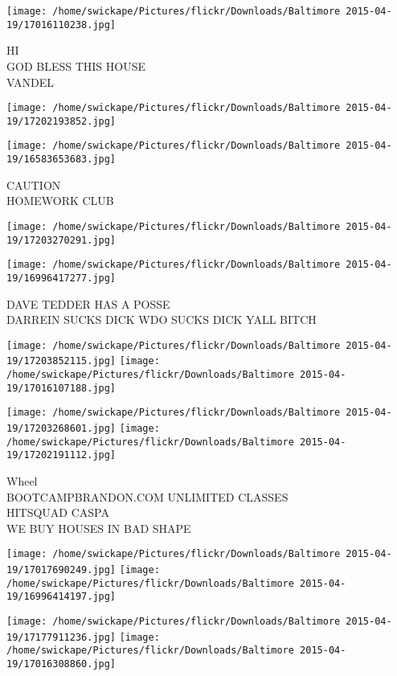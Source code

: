 \documentclass[10pt,letterpaper]{article}
\begin{document}
\texttt{[image: /home/swickape/Pictures/flickr/Downloads/Baltimore 2015-04-19/17016110238.jpg]}

HI\\
GOD BLESS THIS HOUSE\\
VANDEL\\
\pagebreak

\texttt{[image: /home/swickape/Pictures/flickr/Downloads/Baltimore 2015-04-19/17202193852.jpg]}

\vspace{0.25in}
\texttt{[image: /home/swickape/Pictures/flickr/Downloads/Baltimore 2015-04-19/16583653683.jpg]}

CAUTION\\
HOMEWORK CLUB\\
\pagebreak

\texttt{[image: /home/swickape/Pictures/flickr/Downloads/Baltimore 2015-04-19/17203270291.jpg]}

\vspace{0.25in}
\texttt{[image: /home/swickape/Pictures/flickr/Downloads/Baltimore 2015-04-19/16996417277.jpg]}

DAVE TEDDER HAS A POSSE\\
DARREIN SUCKS DICK WDO SUCKS DICK YALL BITCH\\
\pagebreak

\texttt{[image: /home/swickape/Pictures/flickr/Downloads/Baltimore 2015-04-19/17203852115.jpg]}
\texttt{[image: /home/swickape/Pictures/flickr/Downloads/Baltimore 2015-04-19/17016107188.jpg]}

\texttt{[image: /home/swickape/Pictures/flickr/Downloads/Baltimore 2015-04-19/17203268601.jpg]}
\texttt{[image: /home/swickape/Pictures/flickr/Downloads/Baltimore 2015-04-19/17202191112.jpg]}

Wheel\\
BOOTCAMPBRANDON.COM UNLIMITED CLASSES\\
HITSQUAD CASPA\\
WE BUY HOUSES IN BAD SHAPE\\
\pagebreak

\texttt{[image: /home/swickape/Pictures/flickr/Downloads/Baltimore 2015-04-19/17017690249.jpg]}
\texttt{[image: /home/swickape/Pictures/flickr/Downloads/Baltimore 2015-04-19/16996414197.jpg]}

\texttt{[image: /home/swickape/Pictures/flickr/Downloads/Baltimore 2015-04-19/17177911236.jpg]}
\texttt{[image: /home/swickape/Pictures/flickr/Downloads/Baltimore 2015-04-19/17016308860.jpg]}
\end{document}
